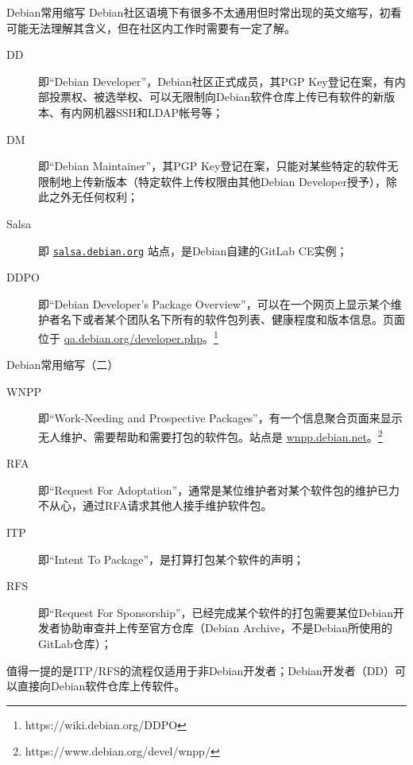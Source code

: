 \begin{frame}{Debian常用缩写}
	Debian社区语境下有很多不太通用但时常出现的英文缩写，初看可能无法理解其含义，但在社区内工作时需要有一定了解。
	\begin{description}
		\item[DD] 即“Debian Developer”，Debian社区正式成员，其PGP Key登记在案，有内部投票权、被选举权、可以无限制向Debian软件仓库上传已有软件的新版本、有内网机器SSH和LDAP帐号等；
		\item[DM] 即“Debian Maintainer”，其PGP Key登记在案，只能对某些特定的软件无限制地上传新版本（特定软件上传权限由其他Debian Developer授予），除此之外无任何权利；
		\item[Salsa] 即 \texttt{\href{https://salsa.debian.org/}{salsa.debian.org}} 站点，是Debian自建的GitLab CE实例；
		\item[DDPO] 即“Debian Developer's Package Overview”，可以在一个网页上显示某个维护者名下或者某个团队名下所有的软件包列表、健康程度和版本信息。页面位于 \href{https://qa.debian.org/developer.php}{qa.debian.org/developer.php}。\footnote{https://wiki.debian.org/DDPO}

		
	\end{description}
\end{frame}

\begin{frame}{Debian常用缩写（二）}
	\begin{description}
		\item[WNPP] 即“Work-Needing and Prospective Packages”，有一个信息聚合页面来显示无人维护、需要帮助和需要打包的软件包。站点是 \href{https://wnpp.debian.net}{wnpp.debian.net}。\footnote{https://www.debian.org/devel/wnpp/}
		\item[RFA] 即“Request For Adoptation”，通常是某位维护者对某个软件包的维护已力不从心，通过RFA请求其他人接手维护软件包。
		\item[ITP] 即“Intent To Package”，是打算打包某个软件的声明；
		\item[RFS] 即“Request For Sponsorship”，已经完成某个软件的打包需要某位Debian开发者协助审查并上传至官方仓库（Debian Archive，不是Debian所使用的GitLab仓库）；
		
	\end{description}
    \vfill
    值得一提的是ITP/RFS的流程仅适用于非Debian开发者；Debian开发者（DD）可以直接向Debian软件仓库上传软件。
\end{frame}